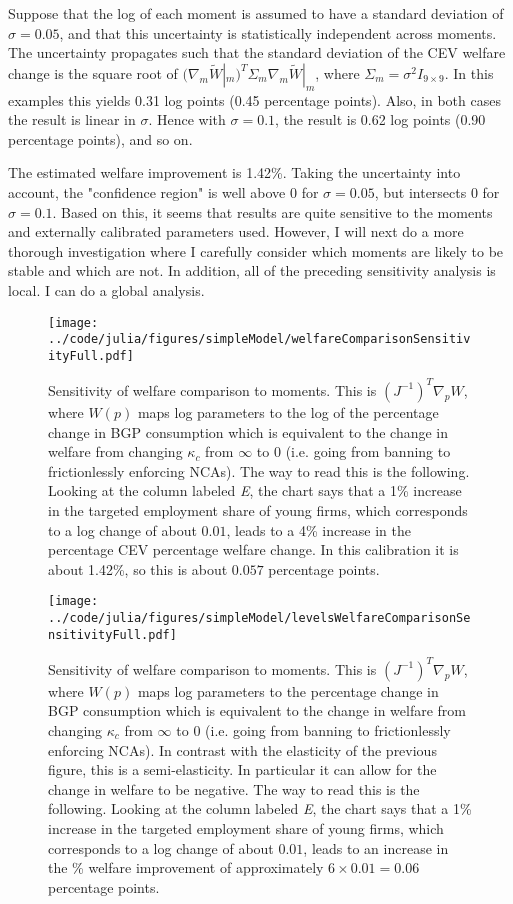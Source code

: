 \documentclass[11pt,english]{article}
\theoremstyle{remark}
\begin{document}
Suppose that the log of each moment is assumed to have a standard deviation of $\sigma = 0.05$, and that this uncertainty is statistically independent across moments. The uncertainty propagates such that the standard deviation of the CEV welfare change is the square root of $(\nabla_m \tilde{W}|_m)^T \Sigma_m \nabla_m \tilde{W}|_m$, where $\Sigma_m = \sigma^2 I_{9\times 9}$. In this examples this yields 0.31 log points (0.45 percentage points). Also, in both cases the result is linear in $\sigma$. Hence with $\sigma = 0.1$, the result is 0.62 log points (0.90 percentage points), and so on.

The estimated welfare improvement is 1.42\%. Taking the uncertainty into account, the "confidence region" is well above 0 for $\sigma = 0.05$, but intersects 0 for $\sigma = 0.1$. Based on this, it seems that results are quite sensitive to the moments and externally calibrated parameters used. However, I will next do a more thorough investigation where I carefully consider which moments are likely to be stable and which are not. In addition, all of the preceding sensitivity analysis is local. I can do a global analysis.


\begin{figure}[]
	\texttt{[image: ../code/julia/figures/simpleModel/welfareComparisonSensitivityFull.pdf]}
	\caption{Sensitivity of welfare comparison to moments. This is $(J^{-1})^T \nabla_p W$, where $W(p)$ maps log parameters to the log of the percentage change in BGP consumption which is equivalent to the change in welfare from changing $\kappa_c$ from $\infty$ to $0$ (i.e. going from banning to frictionlessly enforcing NCAs). The way to read this is the following. Looking at the column labeled \textit{E}, the chart says that a 1\% increase in the targeted employment share of young firms, which corresponds to a log change of about $0.01$, leads to a 4\% increase in the percentage CEV percentage welfare change. In this calibration it is about 1.42\%, so this is about $0.057$ percentage points.}
	\label{welfareComparisonSensitivityFull}
\end{figure}

\begin{figure}[]
	\texttt{[image: ../code/julia/figures/simpleModel/levelsWelfareComparisonSensitivityFull.pdf]}
	\caption{Sensitivity of welfare comparison to moments. This is $(J^{-1})^T \nabla_p W$, where $W(p)$ maps log parameters to the percentage change in BGP consumption which is equivalent to the change in welfare from changing $\kappa_c$ from $\infty$ to $0$ (i.e. going from banning to frictionlessly enforcing NCAs). In contrast with the elasticity of the previous figure, this is a semi-elasticity. In particular it can allow for the change in welfare to be negative. The way to read this is the following. Looking at the column labeled \textit{E}, the chart says that a 1\% increase in the targeted employment share of young firms, which corresponds to a log change of about $0.01$, leads to an increase in the \% welfare improvement of approximately $6 \times 0.01 = 0.06$ percentage points.}
	\label{levelsWelfareComparisonSensitivityFull}
\end{figure}
\end{document}
